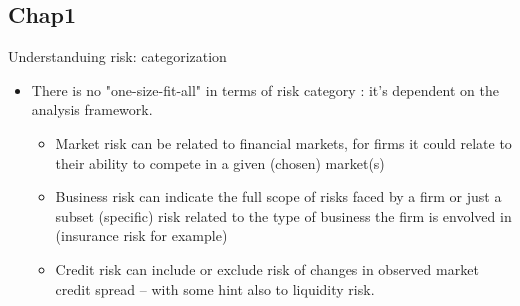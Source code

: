 \documentclass[aspectratio=169, 10pt]{beamer} %
\begin{document}
\subsection{Chap1}
\begin{frame}{Understanduing risk: categorization}
    \begin{itemize}

                 \item [$\bullet$] There is no "one-size-fit-all" in terms of risk category :
                 it's dependent on the analysis framework.  
    \begin{itemize}
        \item [$\bullet$] Market risk can be related to financial markets, for firms it could 
        relate to their ability to compete in a given (chosen) market(s)
          \medskip 
          \item [$\bullet$] Business risk can indicate the full scope of risks faced by a firm or just a subset
          (specific) risk related to the type of business the firm is envolved in (insurance risk for example)
         \medskip 
          \item [$\bullet$] Credit risk can include or exclude risk of changes in observed market 
          credit spread -- with some hint also to liquidity risk.  
    \end{itemize}

    \end{itemize}
\end{frame}
\end{document}
